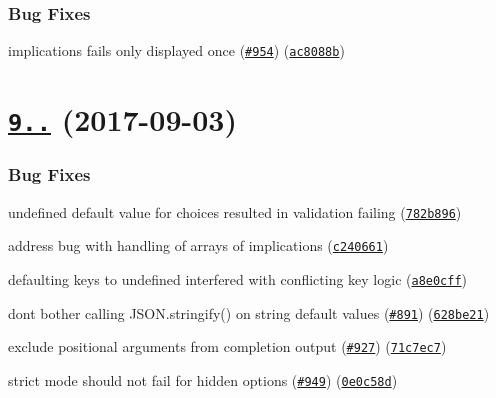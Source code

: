 \subsubsection*{Bug Fixes}


\begin{DoxyItemize}
\item implications fails only displayed once (\href{https://github.com/yargs/yargs/issues/954}{\tt \#954}) (\href{https://github.com/yargs/yargs/commit/ac8088b}{\tt ac8088b})
\end{DoxyItemize}

\label{_9.0.0}%
 \section*{\href{https://github.com/yargs/yargs/compare/v8.0.2...v9.0.0}{\tt 9..} (2017-\/09-\/03)}

\subsubsection*{Bug Fixes}


\begin{DoxyItemize}
\item \textquotesingle{}undefined\textquotesingle{} default value for choices resulted in validation failing (\href{https://github.com/yargs/yargs/commit/782b896}{\tt 782b896})
\item address bug with handling of arrays of implications (\href{https://github.com/yargs/yargs/commit/c240661}{\tt c240661})
\item defaulting keys to \textquotesingle{}undefined\textquotesingle{} interfered with conflicting key logic (\href{https://github.com/yargs/yargs/commit/a8e0cff}{\tt a8e0cff})
\item don\textquotesingle{}t bother calling J\+S\+O\+N.\+stringify() on string default values (\href{https://github.com/yargs/yargs/issues/891}{\tt \#891}) (\href{https://github.com/yargs/yargs/commit/628be21}{\tt 628be21})
\item exclude positional arguments from completion output (\href{https://github.com/yargs/yargs/issues/927}{\tt \#927}) (\href{https://github.com/yargs/yargs/commit/71c7ec7}{\tt 71c7ec7})
\item strict mode should not fail for hidden options (\href{https://github.com/yargs/yargs/issues/949}{\tt \#949}) (\href{https://github.com/yargs/yargs/commit/0e0c58d}{\tt 0e0c58d})
\end{DoxyItemize}

